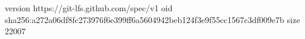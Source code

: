 version https://git-lfs.github.com/spec/v1
oid sha256:a272a06df8fc273976f6e399ff6a5604942beb124f3e9f55cc1567c3df009e7b
size 22007

